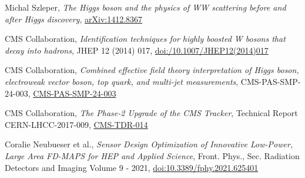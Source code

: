 {\begin{thebibliography}{9}
\bibitem{[4]}
Michal Szleper, {\em The Higgs boson and the physics of WW scattering before and after Higgs discovery}, \href{https://arxiv.org/pdf/1412.8367}{arXiv:1412.8367}


\bibitem{[5]}
CMS Collaboration, {\em Identification techniques for highly boosted W bosons that decay into hadrons}, JHEP 12 (2014) 017, \href{https://link.springer.com/article/10.1007/JHEP12(2014)017}{doi:/10.1007/JHEP12(2014)017}

\bibitem{[6]}
CMS Collaboration, {\em Combined effective field theory interpretation of Higgs boson, electroweak vector boson, top quark, and multi-jet measurements}, CMS-PAS-SMP-24-003, \href{https://cds.cern.ch/record/2911229/}{CMS-PAS-SMP-24-003}

\bibitem{[7]}
CMS Collaboration, {\em The Phase-2 Upgrade of the CMS Tracker}, Technical Report CERN-LHCC-2017-009, \href{https://cds.cern.ch/record/2272264?ln=en}{CMS-TDR-014}

\bibitem{[8]}
Coralie Neubueser et al., {\em Sensor Design Optimization of Innovative Low-Power, Large Area FD-MAPS for HEP and Applied Science}, Front. Phys., Sec. Radiation Detectors and Imaging
Volume 9 - 2021, \href{https://doi.org/10.3389/fphy.2021.625401}{doi:10.3389/fphy.2021.625401}
\end{thebibliography}
}
